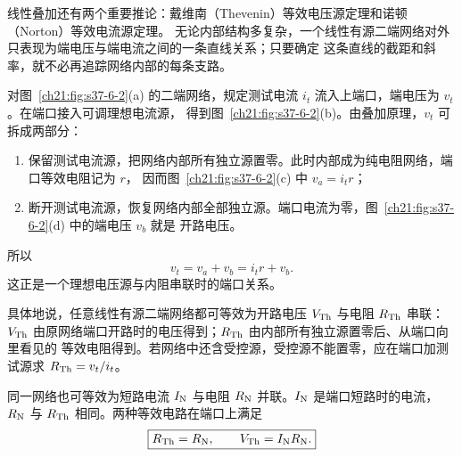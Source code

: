 {线性叠加还有两个重要推论：戴维南（Thevenin）等效电压源定理和诺顿（Norton）等效电流源定理。
无论内部结构多复杂，一个线性有源二端网络对外只表现为端电压与端电流之间的一条直线关系；只要确定
这条直线的截距和斜率，就不必再追踪网络内部的每条支路。

对图~\ref{ch21:fig:s37-6-2}(a) 的二端网络，规定测试电流 $i_t$ 流入上端口，端电压为 $v_t$。在端口接入可调理想电流源，
得到图~\ref{ch21:fig:s37-6-2}(b)。由叠加原理，$v_t$ 可拆成两部分：

\begin{enumerate}
  \item 保留测试电流源，把网络内部所有独立源置零。此时内部成为纯电阻网络，端口等效电阻记为 $r$，
  因而图~\ref{ch21:fig:s37-6-2}(c) 中 $v_a=i_t r$；
  \item 断开测试电流源，恢复网络内部全部独立源。端口电流为零，图~\ref{ch21:fig:s37-6-2}(d) 中的端电压 $v_b$ 就是
  开路电压。
\end{enumerate}

所以
\[
  v_t=v_a+v_b=i_t r+v_b.
\]
这正是一个理想电压源与内阻串联时的端口关系。

\par\noindent\begin{minipage}{\linewidth}
\theveninDerivationFigure
{}
\end{minipage}\par\medskip

具体地说，任意线性有源二端网络都可等效为开路电压 $V_{\rm Th}$ 与电阻 $R_{\rm Th}$ 串联：
$V_{\rm Th}$ 由原网络端口开路时的电压得到；$R_{\rm Th}$ 由内部所有独立源置零后、从端口向里看见的
等效电阻得到。若网络中还含受控源，受控源不能置零，应在端口加测试源求 $R_{\rm Th}=v_t/i_t$。

同一网络也可等效为短路电流 $I_{\rm N}$ 与电阻 $R_{\rm N}$ 并联。$I_{\rm N}$ 是端口短路时的电流，
$R_{\rm N}$ 与 $R_{\rm Th}$ 相同。两种等效电路在端口上满足
\begin{equation}
  \boxed{R_{\rm Th}=R_{\rm N},\qquad V_{\rm Th}=I_{\rm N}R_{\rm N}.}
\end{equation}

\par\noindent\begin{minipage}{\linewidth}
\sourceEquivalenceFigure
{}
\end{minipage}\par\medskip

}
